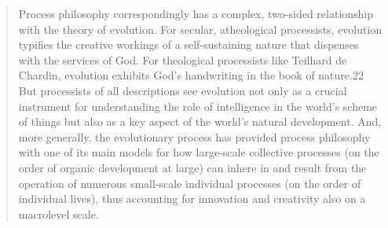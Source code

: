 \documentclass[a4paper]{Thesis}
\begin{document}
\begin{quotation}
		Process philosophy correspondingly has a complex, two-sided relationship with the theory
		of evolution. For secular, atheological processists, evolution typifies the creative workings
		of a self-sustaining nature that dispenses with the services of God. For theological
		processists like Teilhard de Chardin, evolution exhibits God's handwriting in the book of
		nature.22 But processists of all descriptions see evolution not only as a crucial instrument
		for understanding the role of intelligence in the world's scheme of things but also as a key
		aspect of the world's natural development.
		And, more generally, the evolutionary process
		has provided process philosophy with one of its main models for how large-scale
		collective processes (on the order of organic development at large) can inhere in and
		result from the operation of numerous small-scale individual processes (on the order of
		individual lives), thus accounting for innovation and creativity also on a macrolevel scale.	
	\end{quotation}
	
\end{document}
